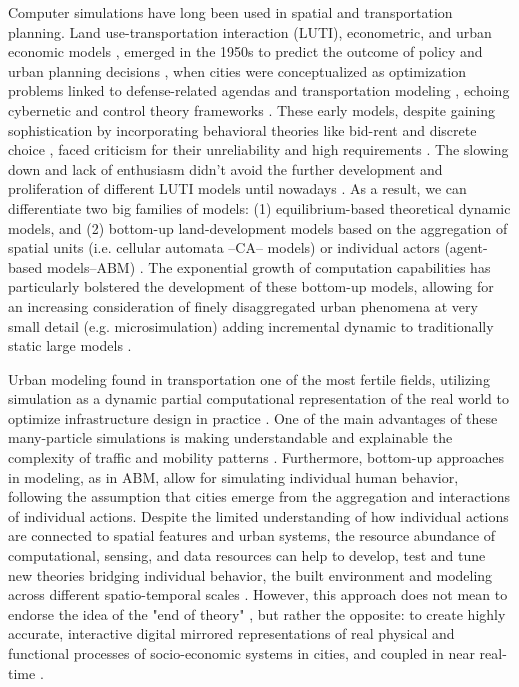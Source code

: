 Computer simulations have long been used in spatial and transportation planning. Land use-transportation interaction (LUTI), econometric, and urban economic models \citep{Echenique2004EconometricTransportation}, emerged in the 1950s to predict the outcome of policy and urban planning decisions \citep{Lowry1964, Forrester1969}, when cities were conceptualized as optimization problems linked to defense-related agendas and transportation modeling \citep{HousingAct1949, HighwayAct1956, UrbanMassTranspAct1964, Kristof1972, Weiner2013}, echoing cybernetic and control theory frameworks \citep{CardosoLlach2015, Pask1969, Pask An Approach to Cybernetics, Wiener194x}. These early models, despite gaining sophistication by incorporating behavioral theories like bid-rent \citep{Alonso1964LocationRent} and discrete choice \citep{McFadden1978}, faced criticism for their unreliability and high requirements \citep{Lee1973RequiemModels}. The slowing down and lack of enthusiasm didn't avoid the further development and proliferation of different LUTI models until nowadays \citep{Southworth1995, Iacono2008, Waddell2002Urbansim:Planning, Wegener2021Land-UseModels, Hunt2005, Timmermans2003, Acheampong2015, Thomas2018CityDeliLUTI, Lopes2019LUTI, Moeckel2018}. As a result, we can differentiate two big families of models: (1) equilibrium-based theoretical dynamic models, and (2) bottom-up land-development models based on the aggregation of spatial units (i.e. cellular automata --CA-- models) or individual actors (agent-based models--ABM) \citep{Heppenstall2012}. The exponential growth of computation capabilities has particularly bolstered the development of these bottom-up models, allowing for an increasing consideration of finely disaggregated urban phenomena at very small detail (e.g. microsimulation) adding incremental dynamic to traditionally static large models \citep{Batty2013SIMULACRA,GarciaCantuRos2014,Cottineau2015}.

Urban modeling found in transportation one of the most fertile fields, utilizing simulation as a dynamic partial computational representation of the real world \citep{Drew1968} to optimize infrastructure design in practice \citep{HCM2016}. One of the main advantages of these many-particle simulations is making understandable and explainable the complexity of traffic and mobility patterns \citep{Helbing2001Many}. Furthermore, bottom-up approaches in modeling, as in ABM, allow for simulating individual human behavior, following the assumption that cities emerge from the aggregation and interactions of individual actions. Despite the limited understanding of how individual actions are connected to spatial features and urban systems, the resource abundance \citep{Hovestadt2017, Carpo2014} of computational, sensing, and data resources can help to develop, test and tune new theories bridging individual behavior, the built environment and modeling across different spatio-temporal scales \citep{Heppenstall2016}. However, this approach does not mean to endorse the idea of the "end of theory" \citep{Anderson2008}, but rather the opposite: to create highly accurate, interactive digital mirrored representations of real physical and functional processes of socio-economic systems in cities, and coupled in near real-time \citep{Batty2018, Mathias2020, Lei2023, Jeddoub2023}.

